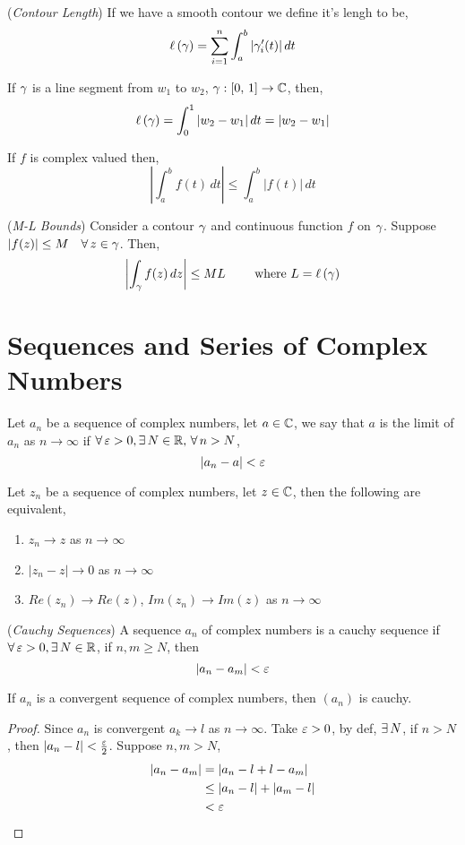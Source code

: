 \documentclass{article}
\begin{document}
\begin{defi}{(\textit{Contour Length})}
  If we have a smooth contour we define it's lengh to be,
  $$ \ell\, (\gamma) = \sum_{i=1}^n {\int_a^b |\gamma_i'(t)|\,dt} $$
\end{defi}

\begin{eg}
  If $\gamma$ is a line segment from $w_1$ to $w_2$, $\gamma : [0,\,1] \to \mathbb{C}$, then,
  $$ \ell\,(\gamma) = \int_0^1 {|w_2 - w_1|}\,dt = |w_2 - w_1| $$
\end{eg}

\begin{lemma}
  If $f$ is complex valued then,
  $$ \left|\int_a^b { f(t) }\,dt \right| \le \int_a^b |f(t)|\, dt$$
\end{lemma}

\begin{ncor}{(\textit{M-L Bounds})}
  Consider a contour $\gamma$ and continuous function $f$ on $\gamma$. Suppose $|f(z)| \le M \quad \forall\, z \in \gamma$. Then,
  $$ \left| \int_\gamma f(z)\,dz \right| \le ML \qquad \text{ where $L = \ell\,(\gamma)$}$$
\end{ncor}

\section{Sequences and Series of Complex Numbers}
Let $a_n$ be a sequence of complex numbers, let $a\in\mathbb{C}$, we say that $a$ is the limit of $a_n$ as $n \to \infty$ if $\forall\, \varepsilon >0, \exists\, N\in \mathbb{R},\,\forall\, n>N$,
$$ |a_n - a| < \varepsilon $$

\begin{nthm}
  Let $z_n$ be a sequence of complex numbers, let $z\in\mathbb{C}$, then the following are equivalent,
  \begin{enumerate}
    \item $z_n \to z$ as $n \to\infty$
    \item $|z_n - z| \to 0$ as $n\to\infty$
    \item $Re(z_n) \to Re(z)$, $Im(z_n) \to Im(z)$ as $n \to \infty$
  \end{enumerate}
\end{nthm}

\begin{ndefi}{(\textit{Cauchy Sequences})}
  A sequence $a_n$ of complex numbers is a cauchy sequence if $\forall\,\varepsilon>0,\exists\, N\in\mathbb{R}$, if $n, m\ge N$, then
  $$ |a_n - a_m| < \varepsilon $$
\end{ndefi}

\begin{nthm}
  If $a_n$ is a convergent sequence of complex numbers, then $(a_n)$ is cauchy.
\end{nthm}
\begin{proof}
  Since $a_n$ is convergent $a_k \to l$ as $n \to\infty$. Take $\varepsilon > 0$, by def, $\exists\, N$, if $n > N$, then $|a_n - l| < \frac{\varepsilon}{2}$. Suppose $n, m > N$,
  \begin{align*}
    |a_n - a_m| &= |a_n - l + l - a_m|\\
    &\le |a_n - l| + |a_m - l|\\
    &< \varepsilon
  \end{align*}
\end{proof}
\end{document}
